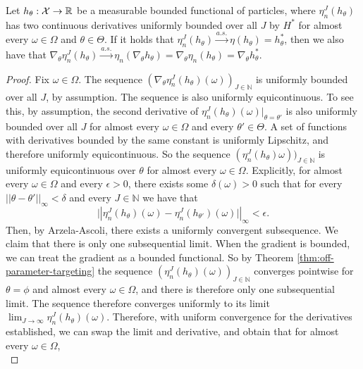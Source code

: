\begin{thm}
    Let $h_\theta : {\mathcal{X}} \to \mathbb{R}$ be a measurable bounded functional of particles, where $\eta_n^J(h_\theta)$ has two continuous derivatives uniformly bounded over all $J$ by $H^*$ for almost every $\omega\in\Omega$ and $\theta \in \Theta$. If it holds that $\eta_n^J(h_\theta) \stackrel{a.s.}{\to} \eta(h_\theta) = h^*_\theta$, then we also have that $\nabla_\theta \eta_n^J(h_\theta)  \stackrel{a.s.}{\to} \eta_n(\nabla_\theta h_\theta) = \nabla_\theta \eta_n(h_\theta) = \nabla_\theta h^*_\theta$. 
\end{thm}
\begin{proof}
    Fix $\omega \in \Omega$. The sequence $(\nabla_\theta \eta_n^J(h_\theta)(\omega))_{J \in \mathbb{N}}$ is uniformly bounded over all $J$, by assumption. The sequence is also uniformly equicontinuous. To see this, by assumption, the second derivative of $\eta_n^J(h_\theta)(\omega)|_{\theta=\theta'}$ is also uniformly bounded over all $J$ for almost every $\omega\in \Omega$ and every $\theta' \in \Theta$. A set of functions with derivatives bounded by the same constant is uniformly Lipschitz, and therefore uniformly equicontinuous. So the sequence $(\eta_n^J(h_\theta)\omega))_{J \in \mathbb{N}}$ is uniformly equicontinuous over $\theta$ for almost every $\omega \in \Omega$. 
    Explicitly, for almost every $\omega \in \Omega$ and every $\epsilon>0$, there exists some $\delta(\omega)>0$ such that for every $||\theta - \theta'||_{\infty}<\delta$ and every $J \in \mathbb{N}$ we have that
    \begin{equation}
    \big||\eta_n^J(h_\theta)(\omega)-\eta_n^J(h_{\theta'})(\omega)\big||_\infty < \epsilon.
    \end{equation}
    Then, by Arzela-Ascoli, there exists a uniformly convergent subsequence. We claim that there is only one subsequential limit. When the gradient is bounded, we can treat the gradient as a bounded functional. So by Theorem \ref{thm:off-parameter-targeting} the sequence $(\eta_n^J(h_\theta)(\omega))_{J \in \mathbb{N}}$ converges pointwise for $\theta=\phi$ and almost every $\omega \in \Omega$, and there is therefore only one subsequential limit. The sequence therefore converges uniformly to its limit $\lim_{J \to \infty} \eta_n^J(h_\theta)(\omega).$ Therefore, with uniform convergence for the derivatives established, we can swap the limit and derivative, and obtain that for almost every $\omega \in \Omega$, 
    \begin{equation}

\end{equation}
\end{proof}
